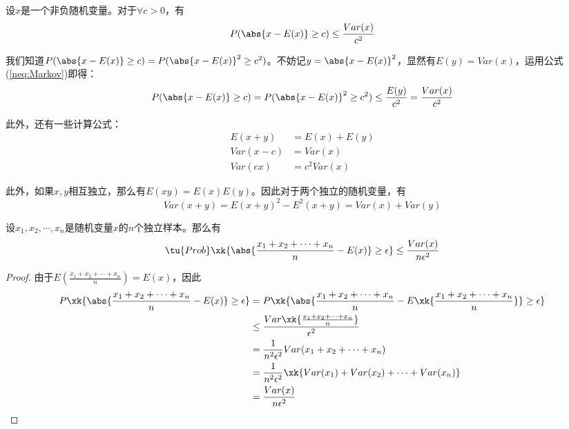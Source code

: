 \documentclass[UTF8]{ctexbook}
\begin{document}
\begin{lemma}
设$x$是一个非负随机变量。对于$\forall c>0$，有
\begin{equation}
	P(\abs{x - E(x)} \ge c) \le \frac{Var(x)}{c^2}
	\label{neq:Cheby}
\end{equation}
\end{lemma}

\begin{lproof}
我们知道$P(\abs{x - E(x)} \ge c) = P(\abs{x - E(x)}^2 \ge c^2)$。不妨记$y = \abs{x - E(x)}^2$，显然有$E(y) = Var(x)$，运用公式(\ref{neq:Markov})即得：
\begin{equation}
	P(\abs{x - E(x)} \ge c) = P(\abs{x - E(x)}^2 \ge c^2) \le \frac{E(y)}{c^2} = \frac{Var(x)}{c^2}
\end{equation}
\end{lproof}


	此外，还有一些计算公式：
\begin{equation}
\begin{split}
E(x+y) &= E(x) + E(y) 
\\
Var(x-c) &= Var(x)
\\
Var(cx) &= c^2Var(x)
\end{split}
\end{equation}

	此外，如果$x, y$相互独立，那么有$E(xy)  = E(x)E(y)$。因此对于两个独立的随机变量，有
\begin{equation}
	Var(x+y) = E(x+y)^2 - E^2(x+y) = Var(x) + Var(y)
\end{equation}

\begin{thm}[大数定理]
设$x_1, x_2, \cdots, x_n$是随机变量$x$的$n$个独立样本。那么有
\begin{equation}
	\tu{Prob}\xk{\abs{\frac{x_1 + x_2 + \cdots + x_n}{n} - E(x)} \ge \epsilon } \le \frac{Var(x)}{n \epsilon^2} 
\end{equation}
\end{thm}

\begin{proof}
由于$E(\frac{x_1 + x_2 + \cdots + x_n}{n}) = E(x)$，因此
\begin{equation}
\begin{split}
P\xk{\abs{\frac{x_1 + x_2 + \cdots + x_n}{n} - E(x)} \ge \epsilon} &=  P\xk{\abs{\frac{x_1 + x_2 + \cdots + x_n}{n} - E\xk{\frac{x_1 + x_2 + \cdots + x_n}{n}}} \ge \epsilon}
\\
&\le \frac{Var\xk{\frac{x_1 + x_2 + \cdots + x_n}{n}}}{\epsilon^2}
\\
&= \frac{1}{n^2\epsilon^2}Var(x_1 + x_2 + \cdots + x_n)
\\
&= \frac{1}{n^2\epsilon^2}\xk{Var(x_1) + Var(x_2) + \cdots + Var(x_n)}
\\
&= \frac{Var(x)}{n \epsilon^2} 
\end{split}
\end{equation}
\end{proof}
\end{document}
